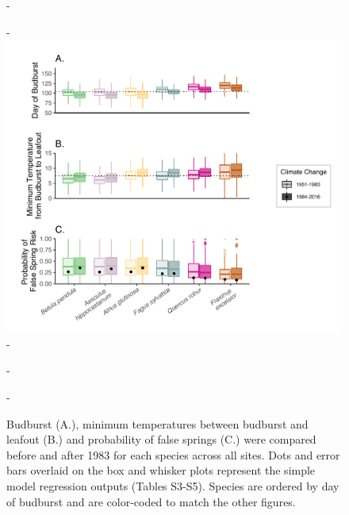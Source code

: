 \documentclass{article}\usepackage[]{graphicx}\usepackage[]{color}
\begin{document}
{\begin{figure} [H]
  -\begin{center}
  -\includegraphics[width=14cm]{..//analyses/figures/Boxplot_BBTminFS_noDots.pdf}
  -\caption{Budburst (A.), minimum temperatures between budburst and leafout (B.) and probability of false springs (C.) were compared before and after 1983 for each species across all sites. Dots and error bars overlaid on the box and whisker plots represent the simple model regression outputs (Tables S3-S5). Species are ordered by day of budburst and are color-coded to match the other figures.  }\label{fig:boxfs}
  -\end{center}
  -\end{figure}}
  
\end{document}
